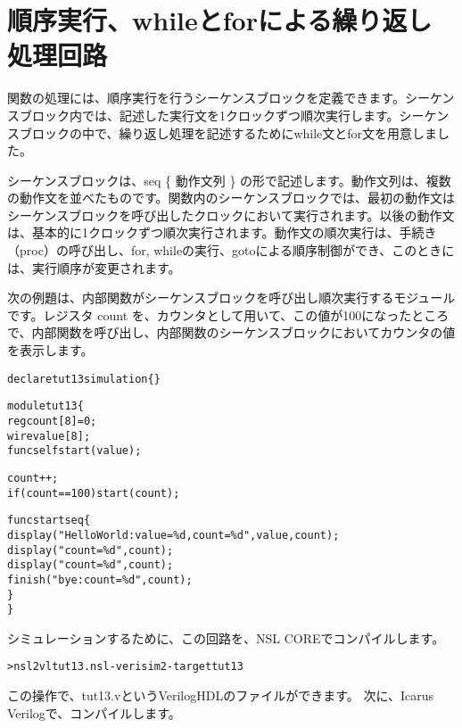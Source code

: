 \chapter{順序実行、whileとforによる繰り返し処理回路}
\label{chap:sequential}

関数の処理には、順序実行を行うシーケンスブロックを定義できます。シーケンスブロック内では、記述した実行文を1クロックずつ順次実行します。シーケンスブロックの中で、繰り返し処理を記述するためにwhile文とfor文を用意しました。

シーケンスブロックは、seq \{ 動作文列 \} の形で記述します。動作文列は、複数の動作文を並べたものです。関数内のシーケンスブロックでは、最初の動作文はシーケンスブロックを呼び出したクロックにおいて実行されます。以後の動作文は、基本的に1クロックずつ順次実行されます。動作文の順次実行は、手続き（proc）の呼び出し、for, whileの実行、gotoによる順序制御ができ、このときには、実行順序が変更されます。

次の例題は、内部関数がシーケンスブロックを呼び出し順次実行するモジュールです。レジスタ count を、カウンタとして用いて、この値が100になったところで、内部関数を呼び出し、内部関数のシーケンスブロックにおいてカウンタの値を表示します。

\begin{reviewlist}
\begin{alltt}
declare tut13 simulation \{ \}

module tut13 \{
    reg count[8] = 0;
    wire value[8];
    func\textunderscore{}self  start(value);

    count++;
    if(count==100) start(count);

    func start seq \{
        \textunderscore{}display("Hello World: value = \%d, count = \%d", value, count);
        \textunderscore{}display("count = \%d", count);
        \textunderscore{}display("count = \%d", count);
        \textunderscore{}finish("bye: count = \%d", count);
    \}
\}
\end{alltt}
\end{reviewlist}


シミュレーションするために、この回路を、NSL COREでコンパイルします。

\begin{reviewcmd}
\begin{alltt}
\textgreater{} nsl2vl tut13.nsl -verisim2 -target tut13
\end{alltt}
\end{reviewcmd}

この操作で、tut13.vというVerilogHDLのファイルができます。
次に、Icarus Verilogで、コンパイルします。

